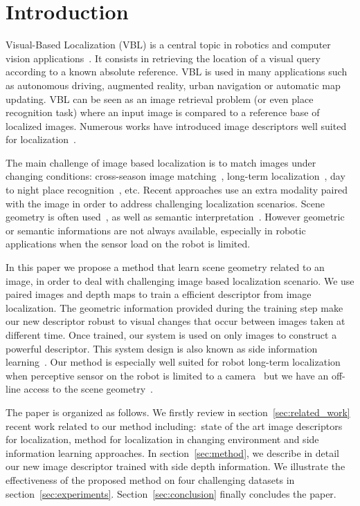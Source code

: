 \section{Introduction}
\label{sec:intro}

Visual-Based Localization (VBL) is a central topic in robotics and computer vision applications~\cite{Piasco2017}. It consists in retrieving the location of a visual query according to a known absolute reference. VBL is used in many applications such as autonomous driving, augmented reality, urban navigation or automatic map updating. VBL can be seen as an image retrieval problem (or even place recognition task) where an input image is compared to a reference base of localized images. Numerous works have introduced image descriptors well suited for localization~\cite{Arandjelovic2017,Kim2017a,Gordo2017,Radenovic2017,Liu2018}. 

The main challenge of image based localization is to match images under changing conditions: cross-season image matching~\cite{}, long-term localization~\cite{}, day to night place recognition~\cite{}, etc. Recent approaches use an extra modality paired with the image in order to address challenging localization scenarios. Scene geometry is often used~\cite{Cavallari?,Schonberger2018}, as well as semantic interpretation~\cite{Ardeshir2014,Christie2016}. However geometric or semantic informations are not always available, especially in robotic applications when the sensor load on the robot is limited.

In this paper we propose a method that learn scene geometry related to an image, in order to deal with challenging image based localization scenario. We use paired images and depth maps to train a efficient descriptor from image localization. The geometric information provided during the training step make our new descriptor robust to visual changes that occur between images taken at different time. Once trained, our system is used on only images to construct a powerful descriptor. This system design is also known as side information learning~\cite{Hoffman2016}. Our method is especially well suited for robot long-term localization when perceptive sensor on the robot is limited to a camera~\cite{Middelberg2014} but we have an off-line access to the scene geometry~\cite{Paparoditis2012,Maddern2016,Wang2016}. 

The paper is organized as follows. We firstly review in section~\ref{sec:related_work} recent work related to our method including:~state of the art image descriptors for localization, method for localization in changing environment and side information learning approaches. In section~\ref{sec:method}, we describe in detail our new image descriptor trained with side depth information. We illustrate the effectiveness of the proposed method on four challenging datasets in section~\ref{sec:experiments}. Section~\ref{sec:conclusion} finally concludes the paper.